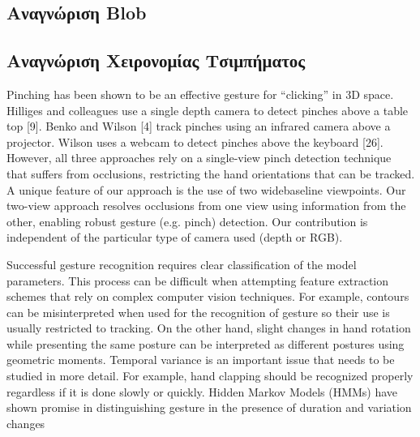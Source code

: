 \subsection{Αναγνώριση Blob}


\subsection{Αναγνώριση Χειρονομίας Τσιμπήματος}



Pinching has been shown to be an effective gesture for “clicking”
in 3D space. Hilliges and colleagues use a single depth
camera to detect pinches above a table top [9]. Benko and
Wilson [4] track pinches using an infrared camera above a
projector. Wilson uses a webcam to detect pinches above
the keyboard [26]. However, all three approaches rely on
a single-view pinch detection technique that suffers from occlusions,
restricting the hand orientations that can be tracked.
A unique feature of our approach is the use of two widebaseline
viewpoints. Our two-view approach resolves occlusions
from one view using information from the other, enabling
robust gesture (e.g. pinch) detection. Our contribution
is independent of the particular type of camera used (depth
or RGB).

Successful gesture recognition requires clear classification of the model parameters. This process can be difficult when attempting feature extraction schemes that rely on complex computer vision techniques. For example, contours can be misinterpreted when used for the recognition of gesture so their use is usually restricted to tracking. On the other hand, slight changes in hand rotation while presenting the same posture can be interpreted as different postures using geometric moments. Temporal variance is an important issue that needs to be studied in more detail. For example, hand clapping should be recognized properly regardless if it is done slowly or quickly. Hidden Markov Models (HMMs) have shown promise in distinguishing gesture in the presence of duration and variation changes

